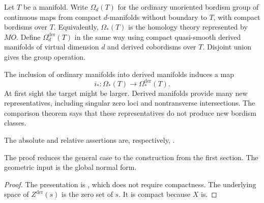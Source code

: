 Let $T$ be a manifold. Write $\Omega_d(T)$ for the ordinary unoriented
bordism group of continuous maps from compact $d$-manifolds without boundary
to $T$, with compact bordisms over $T$. Equivalently,
$\Omega_*(T)$ is the homology theory represented by $MO$. Define
$\Omega_d^{\mathrm{der}}(T)$ in the same way using compact quasi-smooth
derived manifolds of virtual dimension $d$ and derived cobordisms over $T$.
Disjoint union gives the group operation.

The inclusion of ordinary manifolds into derived manifolds induces a map
\[
  i_*
  \colon
  \Omega_*(T)\longrightarrow\Omega_*^{\mathrm{der}}(T).
\]
At first sight the target might be larger. Derived manifolds provide many new
representatives, including singular zero loci and nontransverse
intersections. The comparison theorem says that these representatives do not
produce new bordism classes.


The absolute and relative assertions are, respectively,
\citet[Theorem~3.12 and Corollary~3.13]{Spivak_Derived_Smooth_Manifolds}.

The proof reduces the general case to the construction from the first
section. The geometric input is the global normal form.


\begin{proof}
  The presentation is , which does not
  require compactness. The underlying space of $Z^{\mathrm{der}}(s)$ is the
  zero set of $s$. It is compact because $X$ is.
\end{proof}

